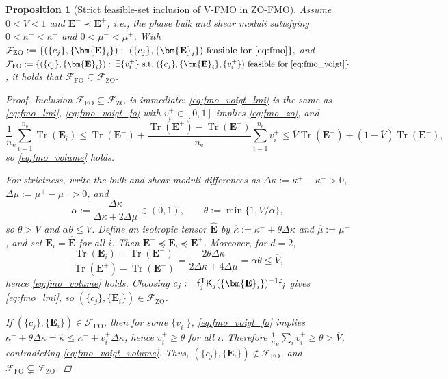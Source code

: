 \documentclass[preprint,3p]{elsarticle}
\newcommand{\tensf}[1]{\bm{\mathbf{#1}}}            %
\newcommand{\trn}{\mathsf{T}}                       %
\newcommand{\Ei}{\tensf{E}_i}                       %
\newcommand{\Emin}{\tensf{E}^{-}}                   %
\newcommand{\Emax}{\tensf{E}^{+}}                   %
\newcommand{\nel}{n_\mathrm{e}}                     %
\newcommand{\semtrx}[1]{\ifcat\noexpand#1\relax\bm{#1}\else\mathsf{#1}\fi}
\newcommand{\sevek}[1]{\ifcat\noexpand#1\relax\bm{#1}\else\mathsf{#1}\fi}
\newcommand{\Tr}{\operatorname{Tr}}
\newtheorem{proposition}{Proposition}[section]
\begin{document}
\begin{proposition}[Strict feasible-set inclusion of V-FMO in ZO-FMO]\label{prop:voigt_inclusion}
    Assume $0<\overline{V}<1$ and $\Emin\prec\Emax$, i.e., the phase bulk and shear moduli satisfying $0<\kappa^-<\kappa^+$ and $0<\mu^-<\mu^+$. With
    $
    \mathcal F_{\mathrm{ZO}}
    :=\{(\{c_j\},\{\Ei\}):\ (\{c_j\},\{\Ei\})\ \text{feasible for \eqref{eq:fmo}}\},
    $ and $\mathcal F_{\mathrm{FO}}
    :=\{(\{c_j\},\{\Ei\}):\ \exists\{v_i^+\}\ \text{s.t.}\ (\{c_j\},\{\Ei\},\{v_i^+\})\ \text{feasible for \eqref{eq:fmo_voigt}}\}$, it holds that $\mathcal F_{\mathrm{FO}}\subsetneq\mathcal F_{\mathrm{ZO}}$.

    \begin{proof}
        Inclusion $\mathcal F_{\mathrm{FO}}\subseteq\mathcal F_{\mathrm{ZO}}$ is immediate: \eqref{eq:fmo_voigt_lmi} is the same as \eqref{eq:fmo_lmi}, \eqref{eq:fmo_voigt_fo} with $v_i^+\in[0,1]$ implies \eqref{eq:fmo_zo}, and
        \begin{equation}
        \frac1\nel\sum_{i=1}^{\nel}\Tr(\Ei)\le
        \Tr(\Emin)+\frac{\Tr(\Emax)-\Tr(\Emin)}{\nel}\sum_{i=1}^{\nel}v_i^+
        \le \overline{V}\Tr(\Emax)+(1-\overline{V})\Tr(\Emin),
        \end{equation}
        so \eqref{eq:fmo_volume} holds.

        For strictness, write the bulk and shear moduli differences as $\Delta\kappa:=\kappa^+-\kappa^->0$, $\Delta\mu:=\mu^+-\mu^->0$, and
        \begin{equation}
        \alpha:=\frac{\Delta\kappa}{\Delta\kappa+2\Delta\mu}\in(0,1),\qquad
        \theta:=\min\{1,\overline{V}/\alpha\},
        \end{equation}
        so $\theta>\overline{V}$ and $\alpha\theta\le\overline{V}$.
        Define an isotropic tensor $\widehat{\tensf E}$ by $\widehat\kappa:=\kappa^-+\theta\Delta\kappa$ and $\widehat\mu:=\mu^-$, and set $\Ei=\widehat{\tensf E}$ for all $i$. Then $\Emin\preceq\Ei\preceq\Emax$. Moreover, for $d=2$,
        \begin{equation}
        \frac{\Tr(\Ei)-\Tr(\Emin)}{\Tr(\Emax)-\Tr(\Emin)}
        =\frac{2\theta\Delta\kappa}{2\Delta\kappa+4\Delta\mu}
        =\alpha\theta\le\overline{V},
        \end{equation}
        hence \eqref{eq:fmo_volume} holds. Choosing $c_j:=\sevek f_j^\trn\semtrx K_j(\{\Ei\})^{-1}\sevek f_j$ gives \eqref{eq:fmo_lmi}, so $(\{c_j\},\{\Ei\})\in\mathcal F_{\mathrm{ZO}}$.

        If $(\{c_j\},\{\Ei\})\in\mathcal F_{\mathrm{FO}}$, then for some $\{v_i^+\}$, \eqref{eq:fmo_voigt_fo} implies $\kappa^-+\theta\Delta\kappa=\widehat\kappa\le \kappa^-+v_i^+\Delta\kappa$, hence $v_i^+\ge\theta$ for all $i$. Therefore $\frac1\nel\sum_i v_i^+\ge\theta>\overline{V}$, contradicting \eqref{eq:fmo_voigt_volume}. Thus, $(\{c_j\},\{\Ei\})\notin\mathcal F_{\mathrm{FO}}$, and $\mathcal F_{\mathrm{FO}}\subsetneq\mathcal F_{\mathrm{ZO}}$.
    \end{proof}
\end{proposition}
\end{document}
